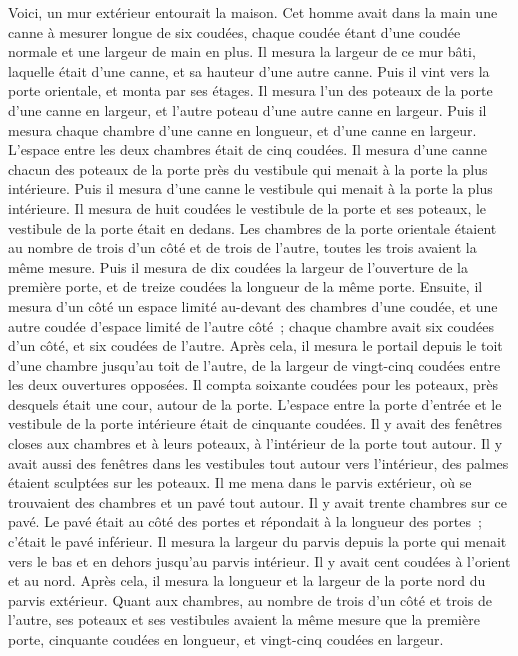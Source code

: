 \begin{multicols}{2}
Voici, un mur extérieur entourait la maison. Cet homme avait dans la main une canne à mesurer longue de six coudées, chaque coudée étant d'une coudée normale et une largeur de main en plus. Il mesura la largeur de ce mur bâti, laquelle était d'une canne, et sa hauteur d'une autre canne.
Puis il vint vers la porte orientale, et monta par ses étages. Il mesura l'un des poteaux de la porte d'une canne en largeur, et l'autre poteau d'une autre canne en largeur.
Puis il mesura chaque chambre d'une canne en longueur, et d'une canne en largeur. L'espace entre les deux chambres était de cinq coudées. Il mesura d'une canne chacun des poteaux de la porte près du vestibule qui menait à la porte la plus intérieure.
Puis il mesura d'une canne le vestibule qui menait à la porte la plus intérieure.
Il mesura de huit coudées le vestibule de la porte et ses poteaux, le vestibule de la porte était en dedans.
Les chambres de la porte orientale étaient au nombre de trois d'un côté et de trois de l'autre, toutes les trois avaient la même mesure.
Puis il mesura de dix coudées la largeur de l'ouverture de la première porte, et de treize coudées la longueur de la même porte.
Ensuite, il mesura d'un côté un espace limité au-devant des chambres d'une coudée, et une autre coudée d'espace limité de l'autre côté~; chaque chambre avait six coudées d'un côté, et six coudées de l'autre.
Après cela, il mesura le portail depuis le toit d'une chambre jusqu'au toit de l'autre, de la largeur de vingt-cinq coudées entre les deux ouvertures opposées.
Il compta soixante coudées pour les poteaux, près desquels était une cour, autour de la porte.
L'espace entre la porte d'entrée et le vestibule de la porte intérieure était de cinquante coudées.
Il y avait des fenêtres closes aux chambres et à leurs poteaux, à l'intérieur de la porte tout autour. Il y avait aussi des fenêtres dans les vestibules tout autour vers l'intérieur, des palmes étaient sculptées sur les poteaux.
Il me mena dans le parvis extérieur, où se trouvaient des chambres et un pavé tout autour. Il y avait trente chambres sur ce pavé.
Le pavé était au côté des portes et répondait à la longueur des portes~; c'était le pavé inférieur.
Il mesura la largeur du parvis depuis la porte qui menait vers le bas et en dehors jusqu'au parvis intérieur. Il y avait cent coudées à l'orient et au nord.
Après cela, il mesura la longueur et la largeur de la porte nord du parvis extérieur.
Quant aux chambres, au nombre de trois d'un côté et trois de l'autre, ses poteaux et ses vestibules avaient la même mesure que la première porte, cinquante coudées en longueur, et vingt-cinq coudées en largeur.

\end{multicols}
